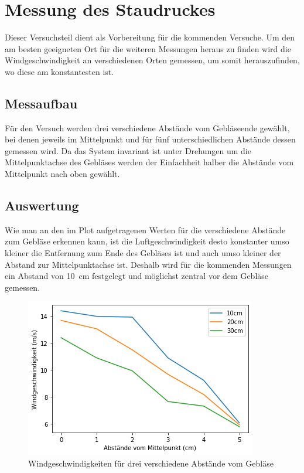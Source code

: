 \section{Messung des Staudruckes}

Dieser Versuchsteil dient als Vorbereitung für die kommenden Versuche. Um den am besten geeigneten Ort für die weiteren Messungen heraus zu finden wird die Windgeschwindigkeit an verschiedenen Orten gemessen, um somit herauszufinden, wo diese am konstantesten ist.

\subsection{Messaufbau}

Für den Versuch werden drei verschiedene Abstände vom Gebläseende gewählt, bei denen jeweils im Mittelpunkt und für fünf unterschiedlichen Abstände dessen gemessen wird. Da das System invariant ist unter Drehungen um die Mittelpunktachse des Gebläses werden der Einfachheit halber die Abstände vom Mittelpunkt nach oben gewählt.

\subsection{Auswertung}

Wie man an den im Plot aufgetragenen Werten für die verschiedene Abstände zum Gebläse erkennen kann, ist die Luftgeschwindigkeit desto konstanter umso kleiner die Entfernung zum Ende des Gebläses ist und auch umso kleiner der Abstand zur Mittelpunktachse ist.
Deshalb wird für die kommenden Messungen ein Abstand von \SI{10}{\centi\metre} festgelegt und möglichst zentral vor dem Gebläse gemessen.

\begin{figure}[h!]
    \centering
    \includegraphics[scale=0.8]{Aeromechanik/Protokoll/fig/Aeromechanik Versuch 1.1.png}
    \caption{Windgeschwindigkeiten für drei verschiedene Abstände vom Gebläse}
    \label{fig:Aeromechanik Versuch 1.1}
\end{figure}

